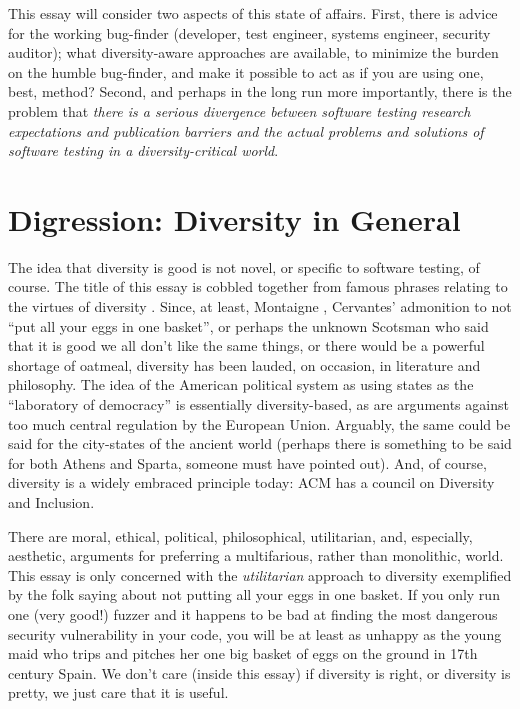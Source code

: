 \documentclass[sigplan,screen]{acmart}
\begin{document}
This essay will consider two aspects of this state of affairs.  First,
there is advice for the working bug-finder (developer, test engineer, systems
engineer, security auditor); what diversity-aware approaches are
available, to minimize the burden on the humble bug-finder, and make
it possible to act as if you are using one, best, method?  Second, and
perhaps in the long run 
more importantly, there is the problem that \emph{there is a serious
divergence between software testing research expectations and
publication barriers and the actual problems and solutions of software testing in a
diversity-critical world}.

\section{Digression: Diversity in General}

The idea that diversity is good is not novel, or specific to software
testing, of course.  The title of this essay is cobbled together from
famous phrases relating to the virtues of diversity \cite{chesterton,mao}.  Since, at least,
Montaigne \cite{montaigne}, Cervantes' \cite{cervantes} admonition to not ``put all your eggs in one
basket'', or perhaps the unknown Scotsman who said that it is good we all
don't like the same things, or there would be a powerful shortage of
oatmeal, diversity has been lauded, on occasion, in literature and
philosophy.  The idea of the American political system as using states
as the ``laboratory of democracy'' is essentially diversity-based, as
are arguments against too much central regulation by the European
Union.  Arguably, the same could be said for the city-states of the
ancient world (perhaps there is something to be said for both Athens
and Sparta, someone must have pointed out).  And, of course, diversity
is a widely embraced principle today: ACM has a council on Diversity
and Inclusion.

There are moral, ethical,
political, philosophical, utilitarian, and, especially,
aesthetic, arguments for preferring a multifarious, rather than
monolithic, world.  This essay is only concerned with the \emph{utilitarian}
approach to diversity exemplified by the folk saying about not putting
all your eggs in one basket.  If you only run one (very good!) fuzzer
and it happens to be bad at finding the most dangerous security
vulnerability in your code, you will be at least as unhappy as the young maid
who trips and pitches her one big basket of eggs on the ground in 17th
century Spain.  We don't care (inside this essay) if diversity is right, or
diversity is pretty, we just care that it is useful.
\end{document}
